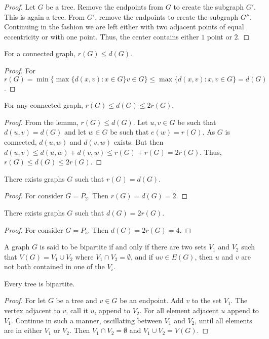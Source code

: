 \documentclass[crop=false,class=book,oneside]{standalone}
\begin{document}
\begin{proof}
Let $G$ be a tree. Remove the endpoints from $G$ to create the subgraph $G'$. This is again a tree. From $G'$, remove the endpoints to create the subgraph $G''$. Continuing in the fashion we are left either with two adjacent points of equal eccentricity or with one point. Thus, the center contains either $1$ point or $2$.
\end{proof}
\begin{lemma}
For a connected graph, $r(G) \leq d(G)$.
\end{lemma}
\begin{proof}
For $r(G) = \min\{\max\{d(x,v):x\in G\} v\in G\} \leq \max\{d(x,v):x,v\in G\}=d(G)$.
\end{proof}
\begin{theorem}
For any connected graph, $r(G) \leq d(G) \leq 2r(G)$.
\end{theorem}
\begin{proof}
From the lemma, $r(G) \leq d(G)$. Let $u,v\in G$ be such that $d(u,v)=d(G)$ and let $w\in G$ be such that $e(w) = r(G)$. As $G$ is connected, $d(u,w)$ and $d(v,w)$ exists. But then $d(u,v)\leq d(u,w)+d(v,w) \leq r(G)+r(G)=2r(G)$. Thus, $r(G)\leq d(G)\leq 2r(G)$.
\end{proof}
\begin{corollary}
There exists graphs $G$ such that $r(G) = d(G)$.
\end{corollary}
\begin{proof}
For consider $G=P_2$. Then $r(G) = d(G) = 2$.
\end{proof}
\begin{corollary}
There exists graphs $G$ such that $d(G) = 2r(G)$.
\end{corollary}
\begin{proof}
For consider $G=P_5$. Then $d(G) = 2r(G) = 4$.
\end{proof}
\begin{definition}
A graph $G$ is said to be bipartite if and only if there are two sets $V_1$ and $V_2$ such that $V(G) = V_1\cup V_2$ where $V_1\cap V_2 = \emptyset$, and if $uv \in E(G)$, then $u$ and $v$ are not both contained in one of the $V_i$.
\end{definition}
\begin{theorem}
Every tree is bipartite.
\end{theorem}
\begin{proof}
For let $G$ be a tree and $v\in G$ be an endpoint. Add $v$ to the set $V_1$. The vertex adjacent to $v$, call it $u$, append to $V_2$. For all element adjacent $u$ append to $V_1$. Continue in such a manner, oscillating between $V_1$ and $V_2$, until all elements are in either $V_1$ or $V_2$. Then $V_1 \cap V_2 = \emptyset$ and $V_1 \cup V_2 = V(G)$.
\end{proof}
\end{document}

